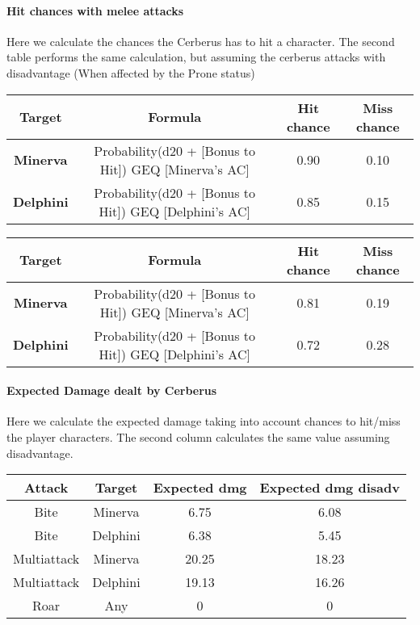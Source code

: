 \paragraph{Hit chances with melee attacks} Here we calculate the chances the Cerberus has to hit a character. The second table performs the same calculation, but assuming the cerberus attacks with disadvantage (When affected by the Prone status) 

\begin{tabular}{c|c|c|c}
	\textbf{Target}   & \textbf{Formula} & \textbf{Hit chance} & \textbf{Miss chance} \\ \hline
	\textbf{Minerva}  &Probability(d20 + [Bonus to Hit]) GEQ [Minerva's AC]    & 0.90 & 0.10 \\ \hline
	\textbf{Delphini} &Probability(d20 + [Bonus to Hit]) GEQ [Delphini's AC]   & 0.85 & 0.15 \\ \hline
\end{tabular}

\begin{tabular}{c|c|c|c}
	\textbf{Target}   & \textbf{Formula} & \textbf{Hit chance} & \textbf{Miss chance} \\ \hline
	\textbf{Minerva}  &Probability(d20 + [Bonus to Hit]) GEQ [Minerva's AC]    & 0.81 & 0.19 \\ \hline
	\textbf{Delphini} &Probability(d20 + [Bonus to Hit]) GEQ [Delphini's AC]   & 0.72 & 0.28 \\ \hline
\end{tabular}

\paragraph{Expected Damage dealt by Cerberus} Here we calculate the expected damage taking into account chances to hit/miss the player characters. The second column calculates the same value assuming disadvantage.

\begin{tabular}{c|c|c|c}
	\textbf{Attack} & \textbf{Target} & \textbf{Expected dmg} & \textbf{Expected dmg disadv} \\ \hline
	Bite            & Minerva         &  6.75                 &  6.08                        \\
	Bite            & Delphini        &  6.38                 &  5.45                        \\
	Multiattack     & Minerva         & 20.25                 & 18.23                        \\
	Multiattack     & Delphini        & 19.13                 & 16.26                        \\
	Roar            & Any             &  0                    &  0                           \\ \hline
\end{tabular}











